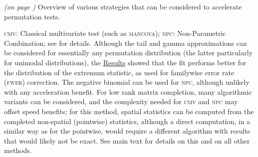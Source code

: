 \begin{table}[!b]
\caption{\emph{(on page \pageref{tab:summary_noref})} Overview of various strategies that can be considered to accelerate permutation tests.}
{\scriptsize
\textsc{cmv}: Classical multivariate test (such as \textsc{mancova}); \textsc{npc}: Non-Parametric Combination; see \citet{Winkler2016_npc} for details. Although the tail and gamma approximations can be considered for essentially any permutation distribution (the latter particularly for unimodal distributions), the \href{sec:accel:results}{Results} showed that the fit performs better for the distribution of the extremum statistic, as used for familywise error rate (\textsc{fwer}) correction. The negative binomial can be used for \textsc{npc}, although unlikely with any acceleration benefit. For low rank matrix completion, many algorithmic variants can be considered, and the complexity needed for \textsc{cmv} and \textsc{npc} may offset speed benefits; for this method, spatial statistics can be computed from the completed non-spatial (pointwise) statistics, although a direct computation, in a similar way as for the pointwise, would require a different algorithm with results that would likely not be exact. See main text for details on this and on all other methods.\par}
\label{tab:summary}
\end{table}

